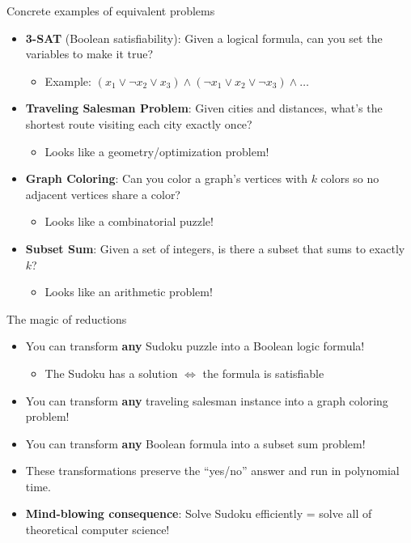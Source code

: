 \documentclass[aspectratio=169, lualatex, handout]{beamer}
\begin{document}
\begin{frame}{Concrete examples of equivalent problems}
	\begin{itemize}[<+->]
		\item \textbf{3-SAT} (Boolean satisfiability): Given a logical formula, can you set the variables to make it true?
		      \begin{itemize}
			      \item Example: $(x_1 \lor \neg x_2 \lor x_3) \land (\neg x_1 \lor x_2 \lor \neg x_3) \land \ldots$
		      \end{itemize}
		\item \textbf{Traveling Salesman Problem}: Given cities and distances, what's the shortest route visiting each city exactly once?
		      \begin{itemize}
			      \item Looks like a geometry/optimization problem!
		      \end{itemize}
		\item \textbf{Graph Coloring}: Can you color a graph's vertices with $k$ colors so no adjacent vertices share a color?
		      \begin{itemize}
			      \item Looks like a combinatorial puzzle!
		      \end{itemize}
		\item \textbf{Subset Sum}: Given a set of integers, is there a subset that sums to exactly $k$?
		      \begin{itemize}
			      \item Looks like an arithmetic problem!
		      \end{itemize}
	\end{itemize}
\end{frame}

\begin{frame}{The magic of reductions}
	\begin{itemize}[<+->]
		\item You can transform \textbf{any} Sudoku puzzle into a Boolean logic formula!
		      \begin{itemize}
			      \item The Sudoku has a solution $\Leftrightarrow$ the formula is satisfiable
		      \end{itemize}
		\item You can transform \textbf{any} traveling salesman instance into a graph coloring problem!
		\item You can transform \textbf{any} Boolean formula into a subset sum problem!
		\item These transformations preserve the ``yes/no'' answer and run in polynomial time.
		\item \textbf{Mind-blowing consequence}: Solve Sudoku efficiently = solve all of theoretical computer science!
	\end{itemize}
\end{frame}
\end{document}
